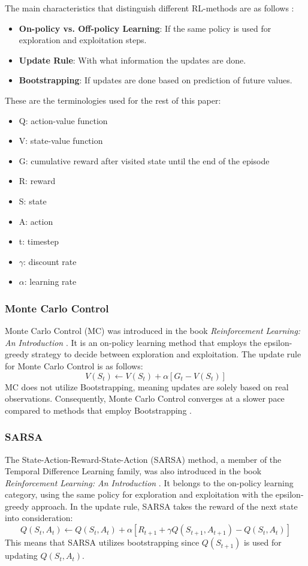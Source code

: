 \documentclass[conference]{IEEEtran}
\begin{document}
The main characteristics that distinguish different RL-methods are as follows \cite{b4}:
\begin{itemize}
	\item \textbf{On-policy vs. Off-policy Learning}: If the same policy is used for exploration and exploitation steps. 
	\item \textbf{Update Rule}: With what information the updates are done. 
	\item \textbf{Bootstrapping}: If updates are done based on prediction of future values. 
\end{itemize}

These are the terminologies used for the rest of this paper: 
\begin{itemize}
	\item Q: action-value function
	\item V: state-value function
	\item G: cumulative reward after visited state until the end of the episode 
	\item R: reward
	\item S: state
	\item A: action
	\item t: timestep
	\item $\gamma$: discount rate
	\item $\alpha$: learning rate
\end{itemize}

\subsubsection{Monte Carlo Control}
Monte Carlo Control (MC) was introduced in the book \textit{Reinforcement Learning: An Introduction} \cite{b4}. It is an on-policy learning method that employs the epsilon-greedy strategy to decide between exploration and exploitation. The update rule for Monte Carlo Control is as follows:
\begin{equation*}
	V(S_t) \leftarrow V(S_t) + \alpha [G_t - V(S_t)] \tag{1}
\end{equation*}
MC does not utilize Bootstrapping, meaning updates are solely based on real observations. Consequently, Monte Carlo Control converges at a slower pace compared to methods that employ Bootstrapping \cite{b4}.


\subsubsection{SARSA}
The State-Action-Reward-State-Action (SARSA) method, a member of the Temporal Difference Learning family, was also introduced in the book \textit{Reinforcement Learning: An Introduction} \cite{b4}. It belongs to the on-policy learning category, using the same policy for exploration and exploitation with the epsilon-greedy approach. In the update rule, SARSA takes the reward of the next state into consideration:
\begin{equation*}
	Q(S_t, A_t) \leftarrow Q(S_t, A_t) + \alpha [R_{t+1} + \gamma Q(S_{t+1}, A_{t+1}) - Q(S_t, A_t)] \tag{2}
\end{equation*}
This means that SARSA utilizes bootstrapping since $Q(S_{t+1})$ is used for updating $Q(S_t, A_t)$. 
\end{document}
